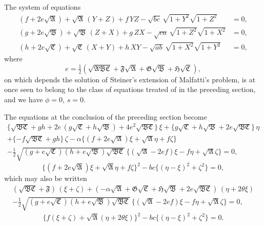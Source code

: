 \documentclass[11pt,a4paper]{book}
\begin{document}
The system of equations
\begin{align*}
(f+2e\sqrt{\mathfrak{A}}) + \sqrt{\mathfrak{A}}\,(Y+Z) + f\,YZ - \sqrt{bc}\,\sqrt{1+Y^2}\sqrt{1+Z^2} &= 0,\\
(g+2e\sqrt{\mathfrak{B}}) + \sqrt{\mathfrak{B}}\,(Z+X) + g\,ZX - \sqrt{ca}\,\sqrt{1+Z^2}\sqrt{1+X^2} &= 0,\\
(h+2e\sqrt{\mathfrak{C}}) + \sqrt{\mathfrak{C}}\,(X+Y) + h\,XY - \sqrt{ab}\,\sqrt{1+X^2}\sqrt{1+Y^2} &= 0,
\end{align*}
where
\[
e = \tfrac{1}{2}(\sqrt{\mathfrak{A}\mathfrak{B}\mathfrak{C}} + \mathfrak{F}\sqrt{\mathfrak{A}} + \mathfrak{G}\sqrt{\mathfrak{B}} + \mathfrak{H}\sqrt{\mathfrak{C}}),
\]
on which depends the solution of Steiner's extension of Malfatti's problem, is at once seen to belong to the class of equations treated of in the preceding section, and we have $\phi=0$, $s=0$.

The equations at the conclusion of the preceding section become
\begin{multline*}
\{\sqrt{\mathfrak{B}\mathfrak{C}}+gh+2e\,(g\sqrt{\mathfrak{C}}+h\sqrt{\mathfrak{B}})+4e^2\sqrt{\mathfrak{B}\mathfrak{C}}\}\,\xi + \{g\sqrt{\mathfrak{C}}+h\sqrt{\mathfrak{B}}+2e\sqrt{\mathfrak{B}\mathfrak{C}}\}\,\eta\\
+ \{-f\sqrt{\mathfrak{B}\mathfrak{C}}+gh\}\,\zeta - \alpha\{(f+2e\sqrt{\mathfrak{A}})\xi+\sqrt{\mathfrak{A}}\eta+f\zeta\}\\
- \tfrac{1}{2}\sqrt{(g+e\sqrt{\mathfrak{C}})(h+e\sqrt{\mathfrak{B}})\sqrt{\mathfrak{B}\mathfrak{C}}}\,\{(\sqrt{\mathfrak{A}}-2e f)\xi - f\eta + \sqrt{\mathfrak{A}}\zeta\} = 0,
\end{multline*}
\[
\{(f+2e\sqrt{\mathfrak{A}})\xi+\sqrt{\mathfrak{A}}\eta+f\zeta\}^2 - bc\{(\eta-\xi)^2+\zeta^2\} = 0,
\]
which may also be written
\begin{multline*}
(\sqrt{\mathfrak{B}\mathfrak{C}}+\mathfrak{F})\,(\xi+\zeta) + (-\alpha\sqrt{\mathfrak{A}}+\mathfrak{G}\sqrt{\mathfrak{C}}+\mathfrak{H}\sqrt{\mathfrak{B}}+2e\sqrt{\mathfrak{B}\mathfrak{C}})\,(\eta+2\theta\xi)\\
- \tfrac{1}{2}\sqrt{(g+e\sqrt{\mathfrak{C}})(h+e\sqrt{\mathfrak{B}})\sqrt{\mathfrak{B}\mathfrak{C}}}\,\{(\sqrt{\mathfrak{A}}-2e f)\xi - f\eta + \sqrt{\mathfrak{A}}\zeta\} = 0,
\end{multline*}
\[
\{f(\xi+\zeta)+\sqrt{\mathfrak{A}}(\eta+2\theta\xi)\}^2 - bc\{(\eta-\xi)^2+\zeta^2\} = 0.
\]
\end{document}
